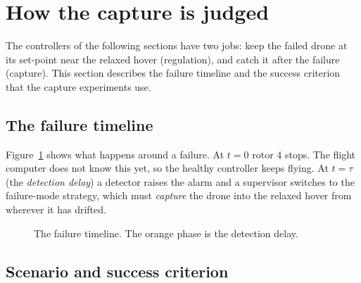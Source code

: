 \section{How the capture is judged}\label{sec:delay}
The controllers of the following sections have two jobs: keep the failed drone at its set-point near the relaxed hover (regulation), and catch it after the failure (capture). This section describes the failure timeline and the success criterion that the capture experiments use.

\subsection{The failure timeline}
Figure~\ref{fig:timeline} shows what happens around a failure. At $t=0$ rotor 4 stops. The flight computer does not know this yet, so the healthy controller keeps flying. At $t=\tau$ (the \emph{detection delay}) a detector raises the alarm and a supervisor switches to the failure-mode strategy, which must \emph{capture} the drone into the relaxed hover from wherever it has drifted.

\begin{figure}[h]
\centering
{}
\caption{The failure timeline. The orange phase is the detection delay.}\label{fig:timeline}
\end{figure}


\subsection{Scenario and success criterion}
